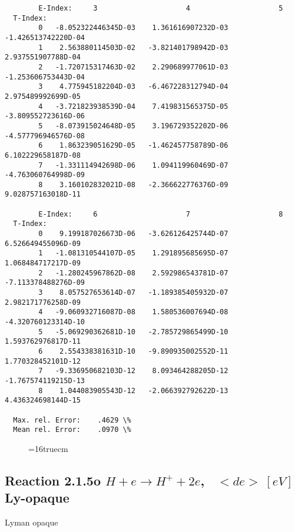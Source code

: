 \documentclass[12pt,dvipdfmx]{article}
\begin{document}
{\begin{small}
\begin{verbatim}
        E-Index:     3                     4                     5
  T-Index:
        0   -8.052322446345D-03    1.361616907232D-03   -1.426513742220D-04
        1    2.563880114503D-02   -3.821401798942D-03    2.937551907788D-04
        2   -1.720715317463D-02    2.290689977061D-03   -1.253606753443D-04
        3    4.775945182204D-03   -6.467228312794D-04    2.975489992699D-05
        4   -3.721823938539D-04    7.419831565375D-05   -3.809552723616D-06
        5   -8.073915024648D-05    3.196729352202D-06   -4.577796946576D-08
        6    1.863239051629D-05   -1.462457758789D-06    6.102229658187D-08
        7   -1.331114942698D-06    1.094119960469D-07   -4.763060764998D-09
        8    3.160102832021D-08   -2.366622776376D-09    9.028757163018D-11

        E-Index:     6                     7                     8
  T-Index:
        0    9.199187026673D-06   -3.626126425744D-07    6.526649455096D-09
        1   -1.081310544107D-05    1.291895685695D-07    1.068484717217D-09
        2   -1.280245967862D-08    2.592986543781D-07   -7.113378488276D-09
        3    8.057527653614D-07   -1.189385405932D-07    2.982171776258D-09
        4   -9.060932716087D-08    1.580536007694D-08   -4.320760123314D-10
        5   -5.069290362681D-10   -2.785729865499D-10    1.593762976817D-11
        6    2.554338381631D-10   -9.890935002552D-11    1.770328452101D-12
        7   -9.336950682103D-12    8.093464288205D-12   -1.767574119215D-13
        8    1.044083905543D-12   -2.066392792622D-13    4.436324698144D-15

  Max. rel. Error:    .4629 \%
  Mean rel. Error:    .0970 \%

\end{verbatim}\end{small}
\begin{figure} \label{2.1.5li2}
\epsfxsize=16truecm
\end{figure}
\newpage

\subsection{
Reaction 2.1.5o  $ H + e \rightarrow H^+ + 2e    $, \   $<de> \ [eV]$ Ly-opaque}

Lyman opaque

\begin{small}\begin{verbatim}




\end{verbatim}
\end{small}}
\end{document}
